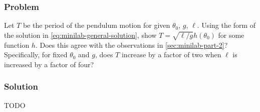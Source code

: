 \documentclass[12pt]{article}
\begin{document}
  \subsubsection*{Problem}
  Let $T$ be the period of the pendulum motion for given $\theta_0$, $g$, $\ell$.
  Using the form of the solution in \cref{eq:minilab-general-solution}, show
  $T=\sqrt{\ell/g}h(\theta_0)$ for some function $h$. Does this agree with the
  observations in \cref{sec:minilab-part-2}? Specifically, for fixed $\theta_0$
  and $g$, does $T$ increase by a factor of two when $\ell$ is increased by a
  factor of four?

  \subsubsection*{Solution}
  {\huge \color{red}TODO}
\end{document}
